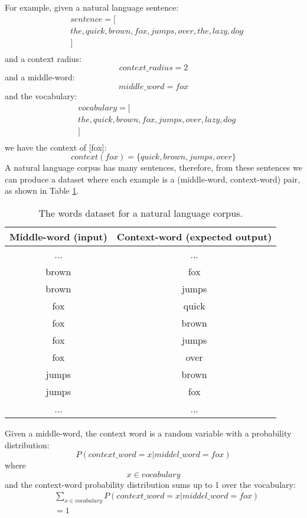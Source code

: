 \documentclass[conference]{IEEEtran}
\begin{document}
For example, given a natural language sentence:
\begin{align*}
	&sentence = [\\
	&the, quick, brown, fox, jumps, over, the, lazy, dog\\
	&]\\
\end{align*}
and a context radius:
\[context\_radius = 2\]
and a middle-word:
\[middle\_word = fox\]
and the vocabulary:
\begin{align*}
	&vocabulary = [\\
	&the, quick, brown, fox, jumps, over, lazy, dog\\
	&]\\
\end{align*}
we have the context of [fox]:
\[ context(fox) = \{quick, brown, jumps, over\} \]
A natural language corpus has many sentences,
therefore, from these sentences we can produce a dataset where each example is a (middle-word, context-word) pair,
as shown in Table \ref{tab:words}.
\begin{table}[!ht]
	\centering
	\caption{The words dataset for a natural language corpus.}
	\begin{tabular}{cc} \hline
		Middle-word (input) & Context-word (expected output) \\ \hline
		... & ...       \\ \hline
		brown & fox \\ \hline
		brown & jumps \\ \hline
		fox & quick \\ \hline
		fox & brown \\ \hline
		fox & jumps \\ \hline
		fox & over \\ \hline
		jumps & brown \\ \hline
		jumps & fox \\ \hline
		... & ...       \\ \hline
	\end{tabular}
	\label{tab:words}
\end{table}
Given a middle-word, the context word is a random variable with a probability distribution:
\[P(context\_word = x | middel\_word = fox)\]
where
\[x \in vocabulary\]
and the context-word probability distribution sums up to 1 over the vocabulary:
\begin{align*}
	&\sum_{x \in vocabulary}P(context\_word = x | middel\_word = fox)\\
	&= 1\\
\end{align*}
\end{document}
